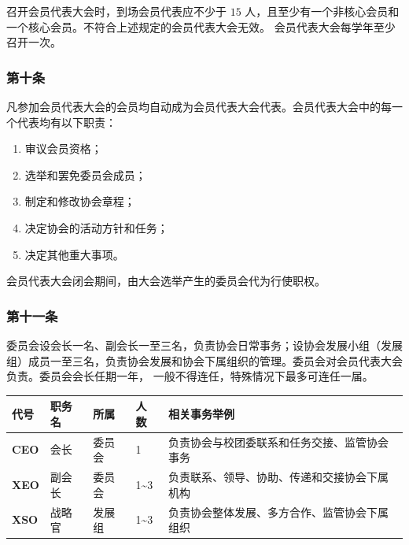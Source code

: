 \documentclass[
]{ctexart}
\begin{document}
召开会员代表大会时，到场会员代表应不少于 \(15\)
人，且至少有一个非核心会员和一个核心会员。不符合上述规定的会员代表大会无效。
会员代表大会每学年至少召开一次。

\hypertarget{ux7b2cux5341ux6761-ux4f1aux5458ux4ee3ux8868ux7684ux804cux8d23}{%
\subsubsection{第十条}\label{ux7b2cux5341ux6761-ux4f1aux5458ux4ee3ux8868ux7684ux804cux8d23}}

凡参加会员代表大会的会员均自动成为会员代表大会代表。会员代表大会中的每一个代表均有以下职责：

\begin{enumerate}
\def\labelenumi{\arabic{enumi}.}
\item
  审议会员资格；
\item
  选举和罢免委员会成员；
\item
  制定和修改协会章程；
\item
  决定协会的活动方针和任务；
\item
  决定其他重大事项。
\end{enumerate}

会员代表大会闭会期间，由大会选举产生的委员会代为行使职权。

\hypertarget{ux7b2cux5341ux4e00ux6761-ux59d4ux5458ux4f1aux7ec4ux7ec7ux7ed3ux6784}{%
\subsubsection{第十一条}\label{ux7b2cux5341ux4e00ux6761-ux59d4ux5458ux4f1aux7ec4ux7ec7ux7ed3ux6784}}

委员会设会长一名、副会长一至三名，负责协会日常事务；设协会发展小组（发展组）成员一至三名，负责协会发展和协会下属组织的管理。委员会对会员代表大会负责。委员会会长任期一年，
一般不得连任，特殊情况下最多可连任一届。

{
\small
\begin{longtable}[]{@{}lllll@{}}
\toprule()
\textbf{代号} & \textbf{职务名} & \textbf{所属} & \textbf{人数} & \textbf{相关事务举例} \\
\midrule()
\endhead
\textbf{CEO} & 会长 & 委员会 & 1 &
负责协会与校团委联系和任务交接、监管协会事务 \\
\textbf{XEO} & 副会长 & 委员会 & 1\textasciitilde 3 &
负责联系、领导、协助、传递和交接协会下属机构 \\
\textbf{XSO} & 战略官 & 发展组 & 1\textasciitilde 3 &
负责协会整体发展、多方合作、监管协会下属组织 \\
\bottomrule()
\end{longtable}
}
\end{document}
